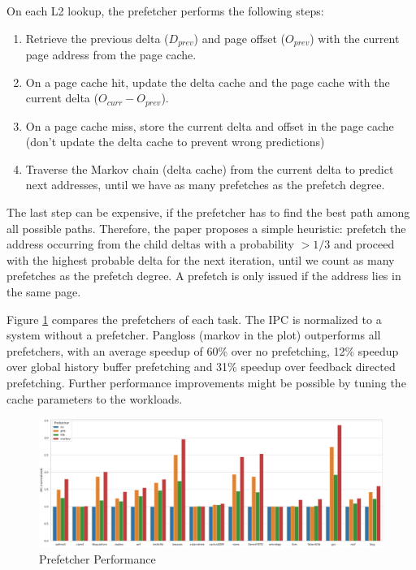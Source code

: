 \documentclass[a4paper]{article}
\begin{document}
On each L2 lookup, the prefetcher performs the following steps:
\begin{enumerate}
    \item Retrieve the previous delta ($D_{prev}$) and page offset
        ($O_{prev}$) with the current page address from the page cache.

    \item On a page cache hit, update the delta cache and the page cache with
        the current delta ($O_{curr} - O_{prev}$).

    \item On a page cache miss, store the current delta and offset in the page
        cache (don't update the delta cache to prevent wrong predictions)

    \item Traverse the Markov chain (delta cache) from the current delta to
        predict next addresses, until we have as many prefetches as the prefetch
        degree.
\end{enumerate}
The last step can be expensive, if the prefetcher has to find the best path
among all possible paths. Therefore, the paper proposes a simple heuristic:
prefetch the address occurring from the child deltas with a probability $>1/3$
and proceed with the highest probable delta for the next iteration, until we
count as many prefetches as the prefetch degree. A prefetch is only issued if
the address lies in the same page.

Figure \ref{fig:performance} compares the prefetchers of each task. The IPC is
normalized to a system without a prefetcher. Pangloss (markov in the plot)
outperforms all prefetchers, with an average speedup of 60\% over no
prefetching, 12\% speedup over global history buffer prefetching\cite{ghb} and
31\% speedup over feedback directed prefetching\cite{fdb}. Further performance
improvements might be possible by tuning the cache parameters to the workloads.

\begin{landscape}
\begin{figure}
    \centering
    \includegraphics[width=\paperwidth]{plot}
    \caption{Prefetcher Performance}
    \label{fig:performance}
\end{figure}
\end{landscape}

\newpage

\printbibliography
\end{document}
